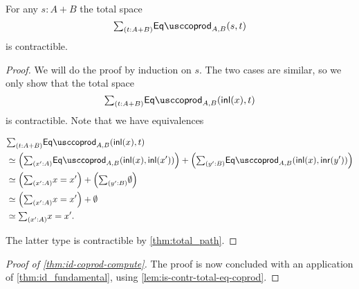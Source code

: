 \begin{lem}\label{lem:is-contr-total-eq-coprod}
For any $s:A+B$ the total space
\begin{equation*}
\sm{t:A+B}\Eqcoprod_{A,B}(s,t)
\end{equation*}
is contractible.
\end{lem}

\begin{proof}
We will do the proof by induction on $s$. The two cases are similar, so we only show that the total space
\begin{equation*}
\sm{t:A+B}\Eqcoprod_{A,B}(\inl(x),t)
\end{equation*}
is contractible. Note that we have equivalences
\begin{samepage}
\begin{align*}
& \sm{t:A+B}\Eqcoprod_{A,B}(\inl(x),t) \\
& \eqvsym \Big(\sm{x':A}\Eqcoprod_{A,B}(\inl(x),\inl(x'))\Big)+\Big(\sm{y':B}\Eqcoprod_{A,B}(\inl(x),\inr(y'))\Big) \\
& \eqvsym \Big(\sm{x':A}x=x'\Big)+\Big(\sm{y':B}\emptyt\Big) \\
& \eqvsym \Big(\sm{x':A}x=x'\Big)+\emptyt \\
& \eqvsym \sm{x':A}x=x'.
\end{align*}%
\end{samepage}%
The latter type is contractible by \cref{thm:total_path}.
\end{proof}

\begin{proof}[Proof of \cref{thm:id-coprod-compute}]
The proof is now concluded with an application of \cref{thm:id_fundamental}, using \cref{lem:is-contr-total-eq-coprod}.
\end{proof}

